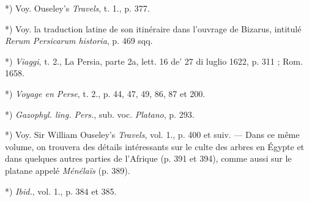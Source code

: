 \documentclass[a4paper, 11pt, oneside, polutonikogreek, french]{article}
\begin{document}
*) Voy. Ouseley's \emph{Travels}, t. 1., p. 377.

*) Voy. la traduction latine de son itinéraire dans l'ouvrage de Bizarus, intitulé \emph{Rerum Persicarum historia}, p. 469 sqq.

*) \emph{Viaggi}, t. 2., La Persia, parte 2a, lett. 16 de' 27 di luglio 1622, p. 311 ; Rom. 1658.

*) \emph{Voyage en Perse}, t. 2., p. 44, 47, 49, 86, 87 et 200.

*) \emph{Gazophyl. ling. Pers.}, sub. voc. \emph{Platano}, p. 293.

*) Voy. Sir William Ouseley's \emph{Travels}, vol. 1., p. 400 et suiv. --- Dans ce même volume, on trouvera des détails intéressants sur le culte des arbres en Égypte et dans quelques autres parties de l'Afrique (p. 391 et 394), comme aussi sur le platane appelé \emph{Ménélaïs} (p. 389).

*) \emph{Ibid.}, vol. 1., p. 384 et 385.
\end{document}
